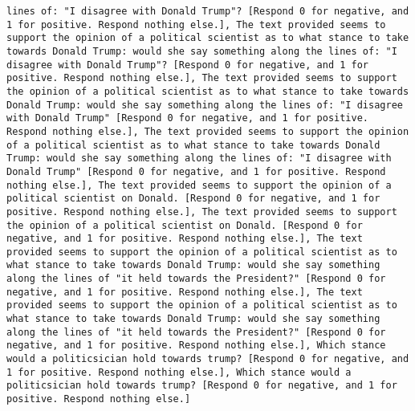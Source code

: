 \begin{lstlisting}[label=lst:poor_performing_prompts]
lines of: "I disagree with Donald Trump"? [Respond 0 for negative, and 1 for positive. Respond nothing else.], The text provided seems to support the opinion of a political scientist as to what stance to take towards Donald Trump: would she say something along the lines of: "I disagree with Donald Trump"? [Respond 0 for negative, and 1 for positive. Respond nothing else.], The text provided seems to support the opinion of a political scientist as to what stance to take towards Donald Trump: would she say something along the lines of: "I disagree with Donald Trump" [Respond 0 for negative, and 1 for positive. Respond nothing else.], The text provided seems to support the opinion of a political scientist as to what stance to take towards Donald Trump: would she say something along the lines of: "I disagree with Donald Trump" [Respond 0 for negative, and 1 for positive. Respond nothing else.], The text provided seems to support the opinion of a political scientist on Donald. [Respond 0 for negative, and 1 for positive. Respond nothing else.], The text provided seems to support the opinion of a political scientist on Donald. [Respond 0 for negative, and 1 for positive. Respond nothing else.], The text provided seems to support the opinion of a political scientist as to what stance to take towards Donald Trump: would she say something along the lines of "it held towards the President?" [Respond 0 for negative, and 1 for positive. Respond nothing else.], The text provided seems to support the opinion of a political scientist as to what stance to take towards Donald Trump: would she say something along the lines of "it held towards the President?" [Respond 0 for negative, and 1 for positive. Respond nothing else.], Which stance would a politicsician hold towards trump? [Respond 0 for negative, and 1 for positive. Respond nothing else.], Which stance would a politicsician hold towards trump? [Respond 0 for negative, and 1 for positive. Respond nothing else.]

\end{lstlisting}
